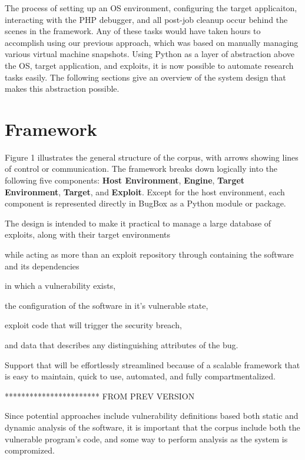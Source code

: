 \documentclass[letterpaper,twocolumn,10pt]{article}
\begin{document}
The process of setting up an OS environment, configuring the target applicaiton, interacting with the PHP debugger, and all post-job cleanup occur behind the scenes in the framework. Any of these tasks would have taken hours to accomplish using our previous approach, which was based on manually managing various virtual machine snapshots. Using Python as a layer of abstraction above the OS, target application, and exploits, it is now possible to automate research tasks easily. The following sections give an overview of the system design that makes this abstraction possible.\\

\section{Framework}

Figure 1 illustrates the general structure of the corpus, with arrows showing lines of control or communication. The framework breaks down logically into the following five components: {\bf Host Environment}, {\bf Engine}, {\bf Target Environment}, {\bf Target}, and {\bf Exploit}. Except for the host environment, each component is represented directly in BugBox as a Python module or package. 

The design is intended to make it practical to manage a large database of exploits, along with their target environments

while acting as more than an exploit repository through containing the software and its dependencies 

in which a vulnerability exists, 

the configuration of the software in it's vulnerable state,

 exploit code that will trigger the security breach, 

and data that describes any distinguishing attributes of the bug.

Support that will be effortlessly streamlined because of a scalable framework that is easy to maintain, quick to use, automated, and fully compartmentalized.  

***********************
FROM PREV VERSION


 Since potential approaches include vulnerability definitions based both static and dynamic analysis of the software, it is important that the corpus include both the vulnerable program's code, and some way to perform analysis as the system is compromized.\\
\end{document}
